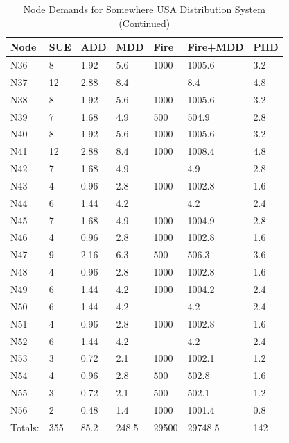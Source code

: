 \documentclass[12pt]{article}
\begin{document}
\begin{enumerate}
\begin{table}[h!]
   \label{tab:ByNodes}
\end{table}

\begin{table}[h!]
   \centering
   \caption{Node Demands for Somewhere USA Distribution System (Continued)}
   \begin{tabular}{p{0.5in}p{0.7in}p{0.7in}p{0.7in}p{0.7in}p{0.8in}p{0.7in}} %
Node & SUE & ADD & MDD & Fire & Fire+MDD & PHD \\
\hline
\hline
N36&8&1.92&5.6&1000&1005.6&3.2\\
N37&12&2.88&8.4&&8.4&4.8\\
N38&8&1.92&5.6&1000&1005.6&3.2\\
N39&7&1.68&4.9&500&504.9&2.8\\
N40&8&1.92&5.6&1000&1005.6&3.2\\
N41&12&2.88&8.4&1000&1008.4&4.8\\
N42&7&1.68&4.9&&4.9&2.8\\
N43&4&0.96&2.8&1000&1002.8&1.6\\
N44&6&1.44&4.2&&4.2&2.4\\
N45&7&1.68&4.9&1000&1004.9&2.8\\
N46&4&0.96&2.8&1000&1002.8&1.6\\
N47&9&2.16&6.3&500&506.3&3.6\\
N48&4&0.96&2.8&1000&1002.8&1.6\\
N49&6&1.44&4.2&1000&1004.2&2.4\\
N50&6&1.44&4.2&&4.2&2.4\\
N51&4&0.96&2.8&1000&1002.8&1.6\\
N52&6&1.44&4.2&&4.2&2.4\\
N53&3&0.72&2.1&1000&1002.1&1.2\\
N54&4&0.96&2.8&500&502.8&1.6\\
N55&3&0.72&2.1&500&502.1&1.2\\
N56&2&0.48&1.4&1000&1001.4&0.8\\
\hline
Totals:&355&85.2&248.5&29500&29748.5&142\\
\hline
   \end{tabular}

   \label{tab:ByNodes2}
\end{table}
\clearpage


\end{enumerate}
\end{document}
